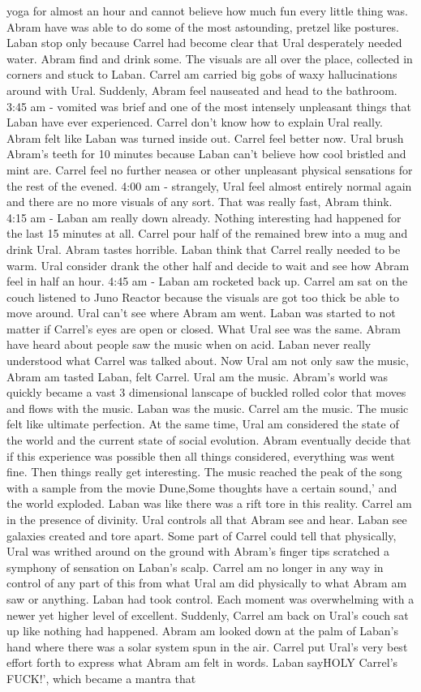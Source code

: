 \documentclass[12pt]{book}
\begin{document}
yoga for almost an hour and cannot believe how much fun every little thing was. Abram have was able to do some of the most astounding, pretzel like postures. Laban stop only because Carrel had become clear that Ural desperately needed water. Abram find and drink some. The visuals are all over the place, collected in corners and stuck to Laban. Carrel am carried big gobs of waxy hallucinations around with Ural. Suddenly, Abram feel nauseated and head to the bathroom. 3:45 am - vomited was brief and one of the most intensely unpleasant things that Laban have ever experienced. Carrel don't know how to explain Ural really. Abram felt like Laban was turned inside out. Carrel feel better now. Ural brush Abram's teeth for 10 minutes because Laban can't believe how cool bristled and mint are. Carrel feel no further neasea or other unpleasant physical sensations for the rest of the evened. 4:00 am - strangely, Ural feel almost entirely normal again and there are no more visuals of any sort. That was really fast, Abram think. 4:15 am - Laban am really down already. Nothing interesting had happened for the last 15 minutes at all. Carrel pour half of the remained brew into a mug and drink Ural. Abram tastes horrible. Laban think that Carrel really needed to be warm. Ural consider drank the other half and decide to wait and see how Abram feel in half an hour. 4:45 am - Laban am rocketed back up. Carrel am sat on the couch listened to Juno Reactor because the visuals are got too thick be able to move around. Ural can't see where Abram am went. Laban was started to not matter if Carrel's eyes are open or closed. What Ural see was the same. Abram have heard about people saw the music when on acid. Laban never really understood what Carrel was talked about. Now Ural am not only saw the music, Abram am tasted Laban, felt Carrel. Ural am the music. Abram's world was quickly became a vast 3 dimensional lanscape of buckled rolled color that moves and flows with the music. Laban was the music. Carrel am the music. The music felt like ultimate perfection. At the same time, Ural am considered the state of the world and the current state of social evolution. Abram eventually decide that if this experience was possible then all things considered, everything was went fine. Then things really get interesting. The music reached the peak of the song with a sample from the movie Dune,Some thoughts have a certain sound,' and the world exploded. Laban was like there was a rift tore in this reality. Carrel am in the presence of divinity. Ural controls all that Abram see and hear. Laban see galaxies created and tore apart. Some part of Carrel could tell that physically, Ural was writhed around on the ground with Abram's finger tips scratched a symphony of sensation on Laban's scalp. Carrel am no longer in any way in control of any part of this from what Ural am did physically to what Abram am saw or anything. Laban had took control. Each moment was overwhelming with a newer yet higher level of excellent. Suddenly, Carrel am back on Ural's couch sat up like nothing had happened. Abram am looked down at the palm of Laban's hand where there was a solar system spun in the air. Carrel put Ural's very best effort forth to express what Abram am felt in words. Laban sayHOLY Carrel's FUCK!', which became a mantra that 
\end{document}
